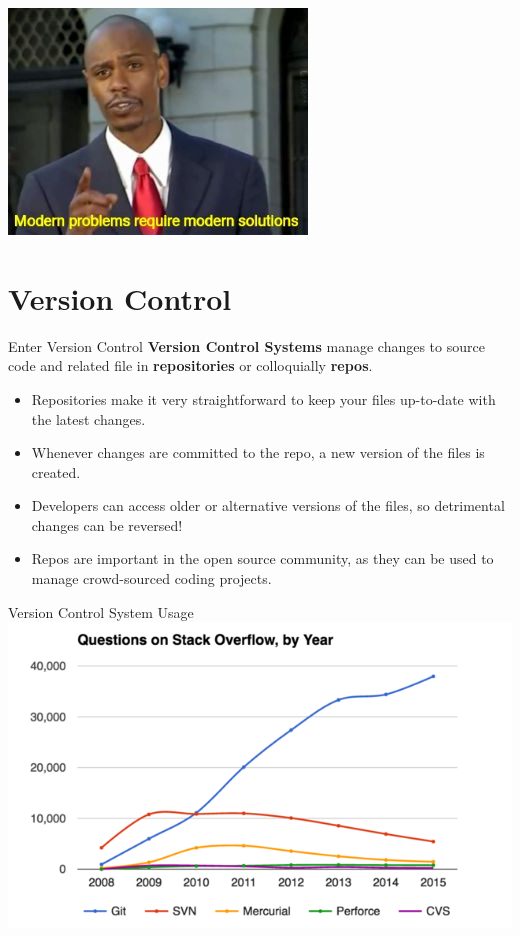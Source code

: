 \documentclass[11pt]{beamer}
\begin{document}
\begin{frame}
\center
\includegraphics[scale=0.8]{modernproblems.jpg}
\end{frame}

\section[Version Control]{Version Control}
\begin{frame}{Enter Version Control}
\textbf{Version Control Systems} manage changes to source code and related file in \textbf{repositories} or colloquially \textbf{repos}.
\begin{itemize}
\item Repositories make it very straightforward to keep your files up-to-date with the latest changes.
\item Whenever changes are committed to the repo, a new version of the files is created.  
\item Developers can access older or alternative versions of the files, so detrimental changes can be reversed!
\item Repos are important in the open source community, as they can be used to manage crowd-sourced coding projects. 
\end{itemize}
\end{frame}

\begin{frame}{Version Control System Usage}
\center
\includegraphics[scale=0.4]{repousage.png}
\end{frame}
\end{document}
